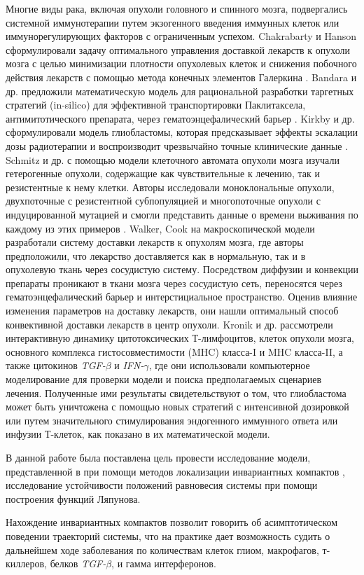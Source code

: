 \documentclass[12pt,a4paper]{extarticle}
\theoremstyle{definition}
\theoremstyle{definition}
\theoremstyle{definition}
\begin{document}
\begin{introduction}
	Многие виды рака, включая опухоли головного и спинного мозга, подвергались системной иммунотерапии путем экзогенного введения иммунных клеток или иммунорегулирующих факторов с ограниченным успехом. Chakrabarty и Hanson сформулировали задачу оптимального управления доставкой лекарств к опухоли мозга с целью минимизации плотности опухолевых клеток и снижения побочного действия лекарств с помощью метода конечных элементов Галеркина \cite{Chakrabarty et.al.}. Bandara и др. предложили математическую модель для рациональной разработки таргетных стратегий (in-silico) для эффективной транспортировки Паклитаксела, антимитотического препарата, через гематоэнцефалический барьер \cite{Bandera}. Kirkby и др. сформулировали модель глиобластомы, которая предсказывает эффекты эскалации дозы радиотерапии и воспроизводит чрезвычайно точные клинические данные \cite{Kirkby et.al.}. Schmitz и др. с помощью модели клеточного автомата опухоли мозга изучали гетерогенные опухоли, содержащие как чувствительные к лечению, так и резистентные к нему клетки. Авторы исследовали моноклональные опухоли, двухпоточные с резистентной субпопуляцией и многопоточные опухоли с индуцированной мутацией и смогли представить данные о времени выживания по каждому из этих примеров \cite{Schmitz et.al.}. Walker, Cook \cite{Walker et.al.} на макроскопической модели разработали систему доставки лекарств к опухолям мозга, где авторы предположили, что лекарство доставляется как в нормальную, так и в опухолевую ткань через сосудистую систему. Посредством диффузии и конвекции препараты проникают в ткани мозга через сосудистую сеть, переносятся через гематоэнцефалический барьер и интерстициальное пространство. Оценив влияние изменения параметров на доставку лекарств, они нашли оптимальный способ конвективной доставки лекарств в центр опухоли. Kronik и др. \cite{Kronik et.al.} рассмотрели интерактивную динамику цитотоксических Т-лимфоцитов, клеток опухоли мозга, основного комплекса гистосовместимости (MHC) класса-I и MHC класса-II, а также цитокинов \textit{TGF-}$\beta$ и \textit{IFN-}$\gamma$, где они использовали компьютерное моделирование для проверки модели и поиска предполагаемых сценариев лечения. Полученные ими результаты свидетельствуют о том, что глиобластома может быть уничтожена с помощью новых стратегий с интенсивной дозировкой или путем значительного стимулирования эндогенного иммунного ответа или инфузии Т-клеток, как показано в их математической модели.
	
	В данной работе была поставлена цель провести исследование модели, представленной в \cite{model} при помощи методов локализации инвариантных компактов \cite{invar_comp, invar_comp_localization}, исследование устойчивости положений равновесия системы при помощи построения функций Ляпунова.
	
	Нахождение инвариантных компактов позволит говорить об асимптотическом поведении траекторий системы, что на практике дает возможность судить о дальнейшем ходе заболевания по количествам клеток глиом, макрофагов, т-киллеров, белков \textit{TGF-}$\beta$, и гамма интерферонов.
	
	\end{introduction}
	
\end{document}

